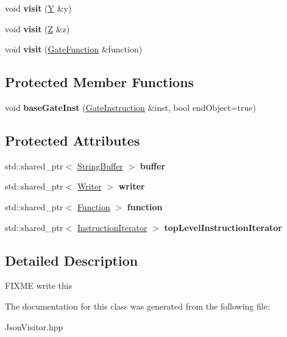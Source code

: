 \begin{DoxyCompactItemize}
\item 
void {\bfseries visit} (\hyperlink{a00342}{Y} \&y)\hypertarget{a00188_a5f08b133da5ae583b40d3324220e68e3}{}\label{a00188_a5f08b133da5ae583b40d3324220e68e3}

\item 
void {\bfseries visit} (\hyperlink{a00343}{Z} \&z)\hypertarget{a00188_a1e1a24feb419b275e2873575242ecbfd}{}\label{a00188_a1e1a24feb419b275e2873575242ecbfd}

\item 
void {\bfseries visit} (\hyperlink{a00111}{Gate\+Function} \&function)\hypertarget{a00188_af80f9bd5dda7f53279baa9823c715f60}{}\label{a00188_af80f9bd5dda7f53279baa9823c715f60}

\end{DoxyCompactItemize}
\subsection*{Protected Member Functions}
\begin{DoxyCompactItemize}
\item 
void {\bfseries base\+Gate\+Inst} (\hyperlink{a00112}{Gate\+Instruction} \&inst, bool end\+Object=true)\hypertarget{a00188_adf4795f80bf4773af8babb9ee7d38c96}{}\label{a00188_adf4795f80bf4773af8babb9ee7d38c96}

\end{DoxyCompactItemize}
\subsection*{Protected Attributes}
\begin{DoxyCompactItemize}
\item 
std\+::shared\+\_\+ptr$<$ \hyperlink{a00127}{String\+Buffer} $>$ {\bfseries buffer}\hypertarget{a00188_a79e14ac35a004c64f3b6a5c684d73598}{}\label{a00188_a79e14ac35a004c64f3b6a5c684d73598}

\item 
std\+::shared\+\_\+ptr$<$ \hyperlink{a00232}{Writer} $>$ {\bfseries writer}\hypertarget{a00188_a4433a92e0c5a1ede71223c275a495241}{}\label{a00188_a4433a92e0c5a1ede71223c275a495241}

\item 
std\+::shared\+\_\+ptr$<$ \hyperlink{a00106}{Function} $>$ {\bfseries function}\hypertarget{a00188_ae943110fac6aa057637fbdf76c39ba9c}{}\label{a00188_ae943110fac6aa057637fbdf76c39ba9c}

\item 
std\+::shared\+\_\+ptr$<$ \hyperlink{a00162}{Instruction\+Iterator} $>$ {\bfseries top\+Level\+Instruction\+Iterator}\hypertarget{a00188_a84ac738710890faa124c0df935bc51d5}{}\label{a00188_a84ac738710890faa124c0df935bc51d5}

\end{DoxyCompactItemize}


\subsection{Detailed Description}
F\+I\+X\+ME write this 

The documentation for this class was generated from the following file\+:\begin{DoxyCompactItemize}
\item 
Json\+Visitor.\+hpp\end{DoxyCompactItemize}
